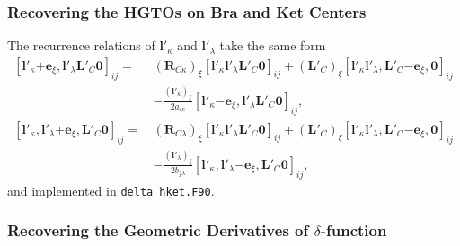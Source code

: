 \documentclass[a4paper,11pt,twoside,openright]{book}
\begin{document}
\subsubsection{Recovering the HGTOs on Bra and Ket Centers}

The recurrence relations of $\boldsymbol{l}'_{\kappa}$ and $\boldsymbol{l}'_{\lambda}$ take the same form~\cite{Gao:IJQC:2010}
\begin{align}
  \label{eq:delta-geo-bra}
  \left[\boldsymbol{l}'_{\kappa}\mathrm{+}\boldsymbol{e}_{\xi},%
    \boldsymbol{l}'_{\lambda}\boldsymbol{L}'_{C}\boldsymbol{0}\right]_{ij}
  =\,&(\boldsymbol{R}_{C\kappa})_{\xi}%
      \left[\boldsymbol{l}'_{\kappa}\boldsymbol{l}'_{\lambda}\boldsymbol{L}'_{C}\boldsymbol{0}\right]_{ij}
  +(\boldsymbol{L}'_{C})_{\xi}%
    \left[\boldsymbol{l}'_{\kappa}\boldsymbol{l}'_{\lambda},%
      \boldsymbol{L}'_{C}\mathrm{-}\boldsymbol{e}_{\xi},\boldsymbol{0}\right]_{ij}\\
  &-\frac{(\boldsymbol{l}'_{\kappa})_{\xi}}{2a_{i\kappa}}%
    \left[\boldsymbol{l}'_{\kappa}\mathrm{-}\boldsymbol{e}_{\xi},\boldsymbol{l}'_{\lambda}%
      \boldsymbol{L}'_{C}\boldsymbol{0}\right]_{ij},\nonumber\\
  \label{eq:delta-geo-ket}
  \left[\boldsymbol{l}'_{\kappa},\boldsymbol{l}'_{\lambda}\mathrm{+}\boldsymbol{e}_{\xi},%
    \boldsymbol{L}'_{C}\boldsymbol{0}\right]_{ij}
  =\,&(\boldsymbol{R}_{C\lambda})_{\xi}%
      \left[\boldsymbol{l}'_{\kappa}\boldsymbol{l}'_{\lambda}\boldsymbol{L}'_{C}\boldsymbol{0}\right]_{ij}
  +(\boldsymbol{L}'_{C})_{\xi}%
    \left[\boldsymbol{l}'_{\kappa}\boldsymbol{l}'_{\lambda},%
      \boldsymbol{L}'_{C}\mathrm{-}\boldsymbol{e}_{\xi},\boldsymbol{0}\right]_{ij}\\
  &-\frac{(\boldsymbol{l}'_{\lambda})_{\xi}}{2b_{j \lambda}}%
    \left[\boldsymbol{l}'_{\kappa},\boldsymbol{l}'_{\lambda}\mathrm{-}\boldsymbol{e}_{\xi},%
      \boldsymbol{L}'_{C}\boldsymbol{0}\right]_{ij},\nonumber
\end{align}
and implemented in \verb|delta_hket.F90|.

\subsubsection[Recovering the Geometric Derivatives of Dirac delta Function]%
  {Recovering the Geometric Derivatives of $\delta$-function}
\end{document}
